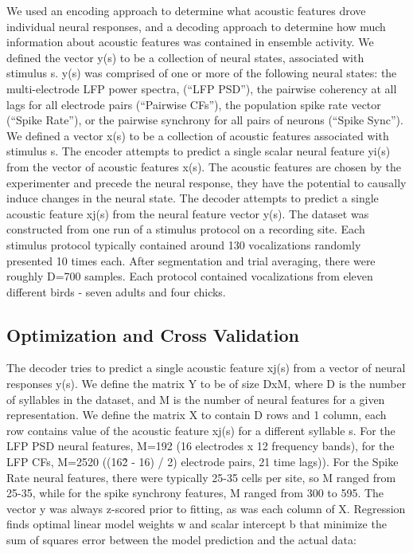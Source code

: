     We used an encoding approach to determine what acoustic features drove individual neural responses, and a decoding approach to determine how much information about acoustic features was contained in ensemble activity. We defined the vector y(s) to be a collection of neural states, associated with stimulus s. y(s) was comprised of one or more of the following neural states: the multi-electrode LFP power spectra, (“LFP PSD”), the pairwise coherency at all lags for all electrode pairs (“Pairwise CFs”), the population spike rate vector (“Spike Rate”), or the pairwise synchrony for all pairs of neurons (“Spike Sync”). We defined a vector x(s) to be a collection of acoustic features associated with stimulus s.
    The encoder attempts to predict a single scalar neural feature yi(s) from the vector of acoustic features x(s). The acoustic features are chosen by the experimenter and precede the neural response, they have the potential to causally induce changes in the neural state. The decoder attempts to predict a single acoustic feature xj(s) from the neural feature vector y(s).     
The dataset was constructed from one run of a stimulus protocol on a recording site. Each stimulus protocol typically contained around 130 vocalizations randomly presented 10 times each. After segmentation and trial averaging, there were roughly D=700 samples. Each protocol contained vocalizations from eleven different birds - seven adults and four chicks. 

\subsection{Optimization and Cross Validation}

The decoder tries to predict a single acoustic feature xj(s) from a vector of neural responses y(s). We define the matrix Y to be of size DxM, where D is the number of syllables in the dataset, and M is the number of neural features for a given representation. We define the matrix X to contain D rows and 1 column, each row contains value of the acoustic feature xj(s) for a different syllable s. For the LFP PSD neural features, M=192 (16 electrodes x 12 frequency bands), for the LFP CFs, M=2520 ((16\^2 - 16) / 2) electrode pairs, 21 time lags)). For the Spike Rate neural features, there were typically 25-35 cells per site, so M ranged from 25-35, while for the spike synchrony features, M ranged from 300 to 595. The vector y was always z-scored prior to fitting, as was each column of X.
    Regression finds optimal linear model weights w and scalar intercept b that minimize the sum of squares error between the model prediction and the actual data:

